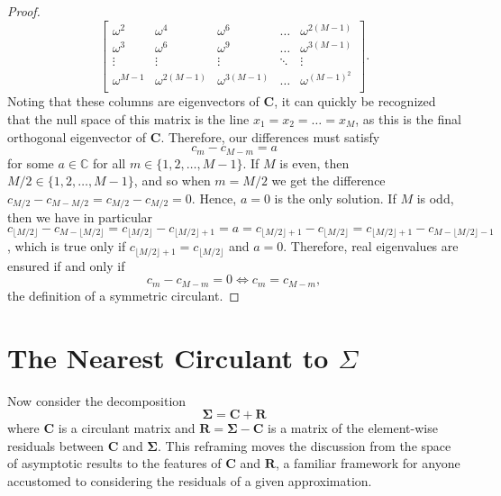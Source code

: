 \documentclass[letterpaper,12pt,oneside,final]{article}
\newcommand{\m}[1]{\mathbf{#1}}               %
\newcommand{\sm}[1]{\boldsymbol{#1}}   %
\newcommand{\field}[1]{\mathbb{#1}}
\newcommand{\Complex}{\field{C}}
\begin{document}
\begin{proof}
$$\begin{bmatrix}
  \omega^2 & \omega^4 & \omega^6 & \dots & \omega^{2(M-1)} \\
  \omega^3 & \omega^6 & \omega^9 & \dots & \omega^{3(M-1)} \\
  \vdots & \vdots & \vdots & \ddots & \vdots \\
  \omega^{M-1} & \omega^{2(M-1)} & \omega^{3(M-1)} & \dots & \omega^{(M-1)^2} \\
  \end{bmatrix}.$$
  Noting that these columns are eigenvectors of $\m{C}$, it can quickly be recognized that the null space of this matrix is the line $x_1 = x_2 = \dots = x_M$, as this is the final orthogonal eigenvector of $\m{C}$. Therefore, our differences must satisfy
  $$c_m - c_{M-m} = a$$
  for some $a \in \Complex$ for all $m \in \{1, 2, \dots, M-1\}$. If $M$ is even, then $M/2 \in \{1, 2, \dots, M-1\}$, and so when $m = M/2$ we get the difference $c_{M/2} - c_{M - M/2} = c_{M/2} - c_{M/2} = 0$. Hence, $a = 0$ is the only solution. If $M$ is odd, then we have in particular $c_{\lfloor M/2 \rfloor} - c_{M - \lfloor M/2 \rfloor} = c_{\lfloor M/2 \rfloor} - c_{\lfloor M/2 \rfloor + 1} = a = c_{\lfloor M/2 \rfloor + 1} - c_{\lfloor M/2 \rfloor} = c_{\lfloor M/2 \rfloor + 1} - c_{M - \lfloor M/2 \rfloor - 1}$, which is true only if $c_{\lfloor M/2 \rfloor + 1} = c_{\lfloor M/2 \rfloor}$ and $a = 0$. Therefore, real eigenvalues are ensured if and only if
  $$c_m - c_{M-m} = 0 \iff c_m = c_{M-m},$$
  the definition of a symmetric circulant.
\end{proof}

\section{The Nearest Circulant to $\Sigma$} \label{c:multipleTesting:nearestCirc}

Now consider the decomposition
\begin{equation} \label{eq:circDecomp}
  \sm{\Sigma} = \m{C} + \m{R}
\end{equation}
where $\m{C}$ is a circulant matrix and $\m{R} = \sm{\Sigma} - \m{C}$ is a matrix of the element-wise residuals between $\m{C}$ and $\sm{\Sigma}$. This reframing moves the discussion from the space of asymptotic results to the features of $\m{C}$ and $\m{R}$, a familiar framework for anyone accustomed to considering the residuals of a given approximation.
\end{document}
